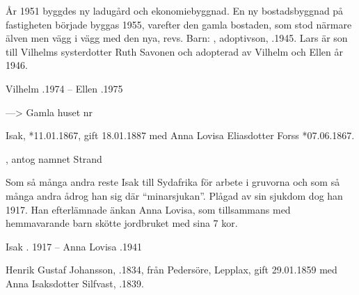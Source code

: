 År 1951 byggdes ny ladugård och ekonomiebyggnad. En ny bostadsbyggnad på fastigheten började byggas 1955, varefter den gamla bostaden, som stod närmare älven men vägg i vägg med den nya, revs.
Barn:  , adoptivson, .1945. Lars är son till Vilhelms systerdotter Ruth Savonen och adopterad av Vilhelm och Ellen år 1946.

Vilhelm .1974  --  Ellen .1975



---> Gamla huset nr 



Isak, *11.01.1867, gift 18.01.1887 med Anna Lovisa Eliasdotter Forss *07.06.1867.
\begin{jhchildren}
  \item {}
  \item {}, antog namnet Strand
  \item {}
  \item {}
  \item {}
  \item {}
  \item {}
  \item {}
  \item {}
\end{jhchildren}

Som så många andra reste Isak till Sydafrika för arbete i gruvorna och som så många andra ådrog han sig där ``minarsjukan''. Plågad av sin sjukdom dog han 1917. Han efterlämnade änkan Anna Lovisa, som tillsammans med hemmavarande barn skötte jordbruket med sina 7 kor.

Isak . 1917  --  Anna Lovisa .1941



Henrik Gustaf Johansson, .1834, från Pedersöre, Lepplax, gift 29.01.1859 med Anna Isaksdotter Silfvast, .1839.
\begin{jhchildren}
  \item {}
  \item {}
  \item {}
  \item {}
\end{jhchildren}

